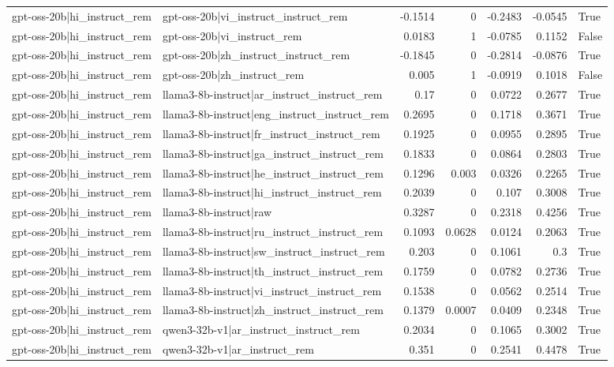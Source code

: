 \begin{table}
\begin{tabular}{l l r r r r l}
gpt-oss-20b|hi_instruct_rem & gpt-oss-20b|vi_instruct_instruct_rem & -0.1514 & 0 & -0.2483 & -0.0545 & True \\
gpt-oss-20b|hi_instruct_rem & gpt-oss-20b|vi_instruct_rem & 0.0183 & 1 & -0.0785 & 0.1152 & False \\
gpt-oss-20b|hi_instruct_rem & gpt-oss-20b|zh_instruct_instruct_rem & -0.1845 & 0 & -0.2814 & -0.0876 & True \\
gpt-oss-20b|hi_instruct_rem & gpt-oss-20b|zh_instruct_rem & 0.005 & 1 & -0.0919 & 0.1018 & False \\
gpt-oss-20b|hi_instruct_rem & llama3-8b-instruct|ar_instruct_instruct_rem & 0.17 & 0 & 0.0722 & 0.2677 & True \\
gpt-oss-20b|hi_instruct_rem & llama3-8b-instruct|eng_instruct_instruct_rem & 0.2695 & 0 & 0.1718 & 0.3671 & True \\
gpt-oss-20b|hi_instruct_rem & llama3-8b-instruct|fr_instruct_instruct_rem & 0.1925 & 0 & 0.0955 & 0.2895 & True \\
gpt-oss-20b|hi_instruct_rem & llama3-8b-instruct|ga_instruct_instruct_rem & 0.1833 & 0 & 0.0864 & 0.2803 & True \\
gpt-oss-20b|hi_instruct_rem & llama3-8b-instruct|he_instruct_instruct_rem & 0.1296 & 0.003 & 0.0326 & 0.2265 & True \\
gpt-oss-20b|hi_instruct_rem & llama3-8b-instruct|hi_instruct_instruct_rem & 0.2039 & 0 & 0.107 & 0.3008 & True \\
gpt-oss-20b|hi_instruct_rem & llama3-8b-instruct|raw & 0.3287 & 0 & 0.2318 & 0.4256 & True \\
gpt-oss-20b|hi_instruct_rem & llama3-8b-instruct|ru_instruct_instruct_rem & 0.1093 & 0.0628 & 0.0124 & 0.2063 & True \\
gpt-oss-20b|hi_instruct_rem & llama3-8b-instruct|sw_instruct_instruct_rem & 0.203 & 0 & 0.1061 & 0.3 & True \\
gpt-oss-20b|hi_instruct_rem & llama3-8b-instruct|th_instruct_instruct_rem & 0.1759 & 0 & 0.0782 & 0.2736 & True \\
gpt-oss-20b|hi_instruct_rem & llama3-8b-instruct|vi_instruct_instruct_rem & 0.1538 & 0 & 0.0562 & 0.2514 & True \\
gpt-oss-20b|hi_instruct_rem & llama3-8b-instruct|zh_instruct_instruct_rem & 0.1379 & 0.0007 & 0.0409 & 0.2348 & True \\
gpt-oss-20b|hi_instruct_rem & qwen3-32b-v1|ar_instruct_instruct_rem & 0.2034 & 0 & 0.1065 & 0.3002 & True \\
gpt-oss-20b|hi_instruct_rem & qwen3-32b-v1|ar_instruct_rem & 0.351 & 0 & 0.2541 & 0.4478 & True \\

\end{tabular}
\end{table}
